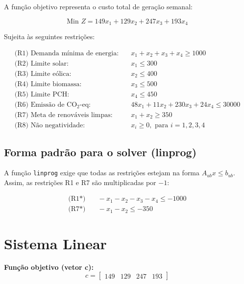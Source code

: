 \documentclass[12pt]{article}
\begin{document}
A função objetivo representa o custo total de geração semanal:

\[
\text{Min } Z = 149x_1 + 129x_2 + 247x_3 + 193x_4
\]

Sujeita às seguintes restrições:

\begin{align*}
\text{(R1) Demanda mínima de energia:} &\quad x_1 + x_2 + x_3 + x_4 \geq 1000 \\
\text{(R2) Limite solar:} &\quad x_1 \leq 300 \\
\text{(R3) Limite eólica:} &\quad x_2 \leq 400 \\
\text{(R4) Limite biomassa:} &\quad x_3 \leq 500 \\
\text{(R5) Limite PCH:} &\quad x_4 \leq 450 \\
\text{(R6) Emissão de CO$_2$-eq:} &\quad 48x_1 + 11x_2 + 230x_3 + 24x_4 \leq 30000 \\
\text{(R7) Meta de renováveis limpas:} &\quad x_1 + x_2 \geq 350 \\
\text{(R8) Não negatividade:} &\quad x_i \geq 0, \text{ para } i = 1,2,3,4
\end{align*}

\subsection*{Forma padrão para o solver (linprog)}

A função \texttt{linprog} exige que todas as restrições estejam na forma $A_{ub}x \leq b_{ub}$. Assim, as restrições R1 e R7 são multiplicadas por $-1$:

\begin{align*}
\text{(R1*)} &\quad -x_1 - x_2 - x_3 - x_4 \leq -1000 \\
\text{(R7*)} &\quad -x_1 - x_2 \leq -350
\end{align*}

\section*{Sistema Linear}

\textbf{Função objetivo (vetor c):}
\[
c = \begin{bmatrix}
149 & 129 & 247 & 193
\end{bmatrix}
\]
\end{document}
